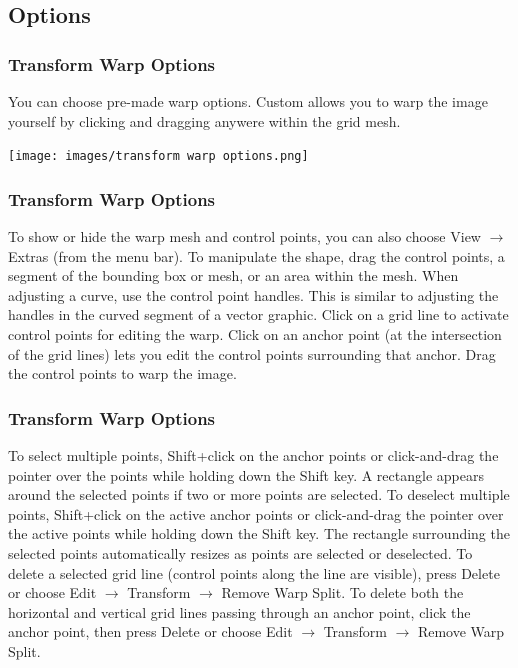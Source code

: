 \documentclass{beamer}
\begin{document}
\subsection{Options}		
	\begin{frame}
		\frametitle{Transform Warp Options}
		\begin{outline}
			\1 You can choose pre-made warp options.
			\1 Custom allows you to warp the image yourself by clicking and dragging anywere within the grid mesh.
		\end{outline}
	\begin{center}
	\texttt{[image: images/transform warp options.png]}
\end{center}
	\end{frame}

	\begin{frame}
	\frametitle{Transform Warp Options}
	\begin{outline}
		\1 To show or hide the warp mesh and control points, you can also choose View $\rightarrow$ Extras (from the menu bar).
		\1 To manipulate the shape, drag the control points, a segment of the bounding box or mesh, or an area within the mesh. 
		\2 When adjusting a curve, use the control point handles. 
		\2 This is similar to adjusting the handles in the curved segment of a vector graphic.
		\1 Click on a grid line to activate control points for editing the warp. 
		\2 Click on an anchor point (at the intersection of the grid lines) lets you edit the control points surrounding that anchor. 
		\2 Drag the control points to warp the image.
	\end{outline}
\end{frame}

\begin{frame}
	\frametitle{Transform Warp Options}
	\begin{outline}
		\1 To select multiple points, Shift+click on the anchor points or click-and-drag the pointer over the points while holding down the Shift key. 
		\2 A rectangle appears around the selected points if two or more points are selected. 
		\1 To deselect multiple points, Shift+click on the active anchor points or click-and-drag the pointer over the active points while holding down the Shift key. 
		\2 The rectangle surrounding the selected points automatically resizes as points are selected or deselected. 
		\1 To delete a selected grid line (control points along the line are visible), press Delete or choose Edit $\rightarrow$ Transform $\rightarrow$ Remove Warp Split. 
		\1 To delete both the horizontal and vertical grid lines passing through an anchor point, click the anchor point, then press Delete or choose Edit $\rightarrow$ Transform $\rightarrow$ Remove Warp Split.  
	\end{outline}
\end{frame}
\end{document}
